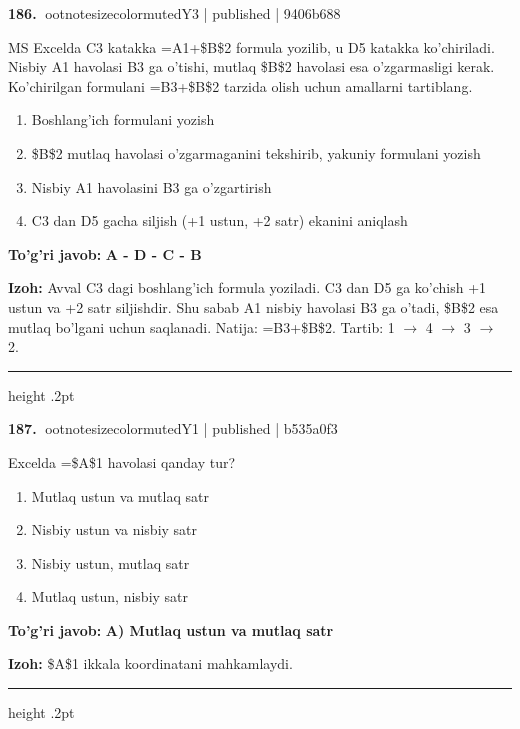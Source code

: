 \documentclass[10pt,a4paper]{article}
\begin{document}
\textbf{\color{ink}186.} {ootnotesizecolor{muted}Y3 | published | 9406b688}
\par
MS Excelda C3 katakka =A1+\$B\$2 formula yozilib, u D5 katakka ko'chiriladi. Nisbiy A1 havolasi B3 ga o'tishi, mutlaq \$B\$2 havolasi esa o'zgarmasligi kerak. Ko'chirilgan formulani =B3+\$B\$2 tarzida olish uchun amallarni tartiblang.
\begin{enumerate}[label=\Alph*),leftmargin=9mm]
\item Boshlang'ich formulani yozish
\item \$B\$2 mutlaq havolasi o'zgarmaganini tekshirib, yakuniy formulani yozish
\item Nisbiy A1 havolasini B3 ga o'zgartirish
\item C3 dan D5 gacha siljish (+1 ustun, +2 satr) ekanini aniqlash
\end{enumerate}
\begin{tcolorbox}[enhanced,breakable,colback=teal!4,colframe=teal!55!black,boxrule=0.45pt,arc=1.2mm,left=2.8mm,right=2.8mm,top=2mm,bottom=2mm]
\textbf{\color{teal}To'g'ri javob:} \textbf{A - D - C - B}
\par\smallskip
\textbf{Izoh:} Avval C3 dagi boshlang'ich formula yoziladi. C3 dan D5 ga ko'chish +1 ustun va +2 satr siljishdir. Shu sabab A1 nisbiy havolasi B3 ga o'tadi, \$B\$2 esa mutlaq bo'lgani uchun saqlanadi. Natija: =B3+\$B\$2. Tartib: 1 \ensuremath{\rightarrow} 4 \ensuremath{\rightarrow} 3 \ensuremath{\rightarrow} 2.
\end{tcolorbox}
\vspace{2mm}\hrule height .2pt\vspace{2mm}

\textbf{\color{ink}187.} {ootnotesizecolor{muted}Y1 | published | b535a0f3}
\par
Excelda =\$A\$1 havolasi qanday tur?
\begin{enumerate}[label=\Alph*),leftmargin=9mm]
\item Mutlaq ustun va mutlaq satr
\item Nisbiy ustun va nisbiy satr
\item Nisbiy ustun, mutlaq satr
\item Mutlaq ustun, nisbiy satr
\end{enumerate}
\begin{tcolorbox}[enhanced,breakable,colback=teal!4,colframe=teal!55!black,boxrule=0.45pt,arc=1.2mm,left=2.8mm,right=2.8mm,top=2mm,bottom=2mm]
\textbf{\color{teal}To'g'ri javob:} \textbf{A) Mutlaq ustun va mutlaq satr}
\par\smallskip
\textbf{Izoh:} \$A\$1 ikkala koordinatani mahkamlaydi.
\end{tcolorbox}
\vspace{2mm}\hrule height .2pt\vspace{2mm}
\end{document}

